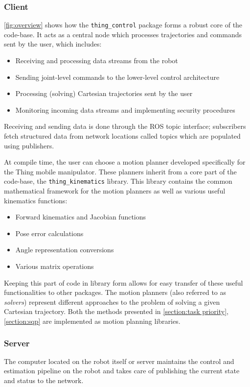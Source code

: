 \documentclass[times, utf8, diplomski, english]{fer}
\begin{document}
\subsubsection{Client}
\autoref{fig:overview} shows how the \verb|thing_control| package forms a robust core of the code-base.
It acts as a central node which processes trajectories and commands sent by the user, which includes:
\begin{itemize}
  \item Receiving and processing data streams from the robot
  \item Sending joint-level commands to the lower-level control architecture
  \item Processing (solving) Cartesian trajectories sent by the user
  \item Monitoring incoming data streams and implementing security procedures
\end{itemize}
Receiving and sending data is done through the ROS topic interface; subscribers fetch structured data from network locations called topics which are populated using publishers.

At compile time, the user can choose a motion planner developed specifically for the Thing mobile manipulator.
These planners inherit from a core part of the code-base, the \verb|thing_kinematics| library.
This library contains the common mathematical framework for the motion planners as well as various useful kinematics functions:
\begin{itemize}
  \item Forward kinematics and Jacobian functions
  \item Pose error calculations
  \item Angle representation conversions
  \item Various matrix operations
\end{itemize}
Keeping this part of code in library form allows for easy transfer of these useful functionalities to other packages.
The motion planners (also referred to as \textit{solvers}) represent different approaches to the problem of solving a given Cartesian trajectory.
Both the methods presented in \autoref{section:task priority}, \autoref{section:sqp} are implemented as motion planning libraries.

\subsubsection{Server}
The computer located on the robot itself or server maintains the control and estimation pipeline on the robot and takes care of publishing the current state and status to the network.
\end{document}
